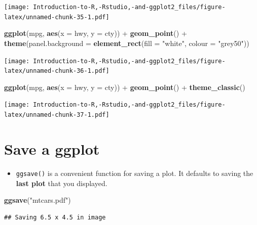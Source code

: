 \documentclass[]{book}
\newenvironment{Shaded}{\begin{snugshade}}{\end{snugshade}}
\newcommand{\KeywordTok}[1]{\textcolor[rgb]{0.13,0.29,0.53}{\textbf{{#1}}}}
\newcommand{\DataTypeTok}[1]{\textcolor[rgb]{0.13,0.29,0.53}{{#1}}}
\newcommand{\StringTok}[1]{\textcolor[rgb]{0.31,0.60,0.02}{{#1}}}
\newcommand{\NormalTok}[1]{{#1}}
\providecommand{\tightlist}{%
  \setlength{\itemsep}{0pt}\setlength{\parskip}{0pt}}
\begin{document}
\texttt{[image: Introduction-to-R,-Rstudio,-and-ggplot2\_files/figure-latex/unnamed-chunk-35-1.pdf]}

\begin{Shaded}
\begin{Highlighting}[]
\KeywordTok{ggplot}\NormalTok{(mpg, }\KeywordTok{aes}\NormalTok{(}\DataTypeTok{x =} \NormalTok{hwy, }\DataTypeTok{y =} \NormalTok{cty)) +}\StringTok{ }\KeywordTok{geom_point}\NormalTok{() +}\StringTok{ }\KeywordTok{theme}\NormalTok{(}\DataTypeTok{panel.background =} \KeywordTok{element_rect}\NormalTok{(}\DataTypeTok{fill =} \StringTok{"white"}\NormalTok{, }\DataTypeTok{colour =} \StringTok{"grey50"}\NormalTok{))}
\end{Highlighting}
\end{Shaded}

\texttt{[image: Introduction-to-R,-Rstudio,-and-ggplot2\_files/figure-latex/unnamed-chunk-36-1.pdf]}

\begin{Shaded}
\begin{Highlighting}[]
\KeywordTok{ggplot}\NormalTok{(mpg, }\KeywordTok{aes}\NormalTok{(}\DataTypeTok{x =} \NormalTok{hwy, }\DataTypeTok{y =} \NormalTok{cty)) +}\StringTok{ }\KeywordTok{geom_point}\NormalTok{() +}\StringTok{ }\KeywordTok{theme_classic}\NormalTok{()}
\end{Highlighting}
\end{Shaded}

\texttt{[image: Introduction-to-R,-Rstudio,-and-ggplot2\_files/figure-latex/unnamed-chunk-37-1.pdf]}

\section{Save a ggplot}\label{save-a-ggplot}

\begin{itemize}
\tightlist
\item
  \texttt{ggsave()} is a convenient function for saving a plot. It
  defaults to saving the \textbf{last plot} that you displayed.
\end{itemize}

\begin{Shaded}
\begin{Highlighting}[]
\KeywordTok{ggsave}\NormalTok{(}\StringTok{"mtcars.pdf"}\NormalTok{)}
\end{Highlighting}
\end{Shaded}

\begin{verbatim}
## Saving 6.5 x 4.5 in image
\end{verbatim}
\end{document}
